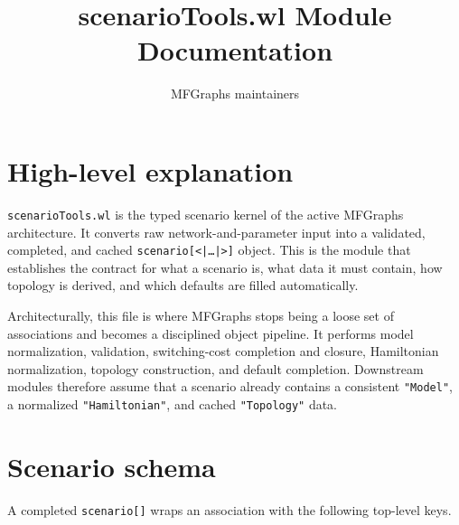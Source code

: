 \documentclass[11pt]{article}
\title{scenarioTools.wl Module Documentation}
\author{MFGraphs maintainers}
\date{}
\begin{document}
\maketitle
\sloppy

\section{High-level explanation}

\texttt{scenarioTools.wl} is the typed scenario kernel of the active MFGraphs architecture. It converts raw network-and-parameter input into a validated, completed, and cached \texttt{scenario[<|\ldots|>]} object. This is the module that establishes the contract for what a scenario is, what data it must contain, how topology is derived, and which defaults are filled automatically.

Architecturally, this file is where MFGraphs stops being a loose set of associations and becomes a disciplined object pipeline. It performs model normalization, validation, switching-cost completion and closure, Hamiltonian normalization, topology construction, and default completion. Downstream modules therefore assume that a scenario already contains a consistent \texttt{"Model"}, a normalized \texttt{"Hamiltonian"}, and cached \texttt{"Topology"} data.

\section{Scenario schema}

A completed \texttt{scenario[\textellipsis]} wraps an association with the following top-level keys.
\end{document}
